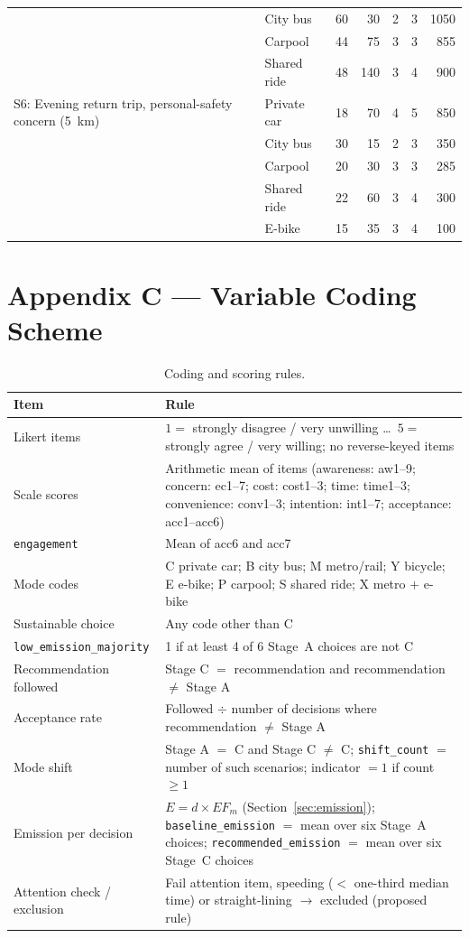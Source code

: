 \documentclass[11pt,a4paper]{article}
\newcommand{\code}[1]{\texttt{#1}}
\begin{document}
\begin{longtable}{@{}p{3.4cm}p{2.2cm}rrrrr@{}}
 & City bus & 60 & 30 & 2 & 3 & 1050\\
 & Carpool & 44 & 75 & 3 & 3 & 855\\
 & Shared ride & 48 & 140 & 3 & 4 & 900\\
\midrule
S6: Evening return trip, personal-safety concern (5~km) & Private car & 18 & 70 & 4 & 5 & 850\\
 & City bus & 30 & 15 & 2 & 3 & 350\\
 & Carpool & 20 & 30 & 3 & 3 & 285\\
 & Shared ride & 22 & 60 & 3 & 4 & 300\\
 & E-bike & 15 & 35 & 3 & 4 & 100\\
\end{longtable}

\section{Appendix C --- Variable Coding Scheme}
\label{app:coding}

\begin{table}[H]
\centering
\small
\caption{Coding and scoring rules.}
\label{tab:C1}
\begin{tabular}{@{}p{3.4cm}p{11.5cm}@{}}
\toprule
\textbf{Item} & \textbf{Rule}\\
\midrule
Likert items & $1 =$ strongly disagree / very unwilling \dots\ $5 =$ strongly agree / very willing; no reverse-keyed items\\
Scale scores & Arithmetic mean of items (awareness: aw1--9; concern: ec1--7; cost: cost1--3; time: time1--3; convenience: conv1--3; intention: int1--7; acceptance: acc1--acc6)\\
\code{engagement} & Mean of acc6 and acc7\\
Mode codes & C private car; B city bus; M metro/rail; Y bicycle; E e-bike; P carpool; S shared ride; X metro $+$ e-bike\\
Sustainable choice & Any code other than C\\
\code{low\_emission\_majority} & 1 if at least 4 of 6 Stage~A choices are not C\\
Recommendation followed & Stage C $=$ recommendation and recommendation $\neq$ Stage A\\
Acceptance rate & Followed $\div$ number of decisions where recommendation $\neq$ Stage A\\
Mode shift & Stage A $=$ C and Stage C $\neq$ C; \code{shift\_count} $=$ number of such scenarios; indicator $=1$ if count $\geq 1$\\
Emission per decision & $E = d \times EF_m$ (Section~\ref{sec:emission}); \code{baseline\_emission} $=$ mean over six Stage~A choices; \code{recommended\_emission} $=$ mean over six Stage~C choices\\
Attention check / exclusion & Fail attention item, speeding ($<$ one-third median time) or straight-lining $\rightarrow$ excluded (proposed rule)\\
\bottomrule
\end{tabular}
\end{table}
\end{document}
